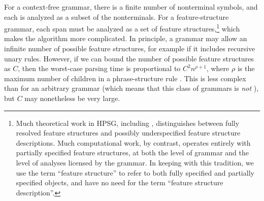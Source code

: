 \documentclass[output=paper
                ,modfonts
                ,nonflat
	        ,collection
	        ,collectionchapter
	        ,collectiontoclongg
 	        ,biblatex
                ,babelshorthands
                ,newtxmath
                ,draftmode
                ,colorlinks, citecolor=brown
]{./langsci/langscibook}
\begin{document}
For a context-free grammar,
there is a finite number of nonterminal symbols,
and each  is analyzed as a subset of the nonterminals.
For a feature-structure grammar, each span must be analyzed as a set of feature structures,\footnote{%
	Much theoretical work in HPSG, including \citet{ps2},
	distinguishes between fully resolved feature structures and possibly underspecified feature structure descriptions.
	Much computational work, by contrast, operates entirely with partially specified feature structures,
	at both the level of grammar and the level of analyses licensed by the grammar.
	In keeping with this tradition, we use the term
	``feature structure'' to refer to both fully specified and partially specified objects,
	and have no need for the term ``feature structure description''.
}
which makes the algorithm more complicated.
In principle, a grammar may allow an infinite number of possible feature structures,
for example if it includes recursive unary rules.
However, if we can bound the number of possible feature structures as $C$,
then the worst-case parsing time is proportional to $C^2 n^{\rho+1}$,
where $\rho$ is the maximum number of children in a phrase-structure rule
\citep[Section~3.2.3]{carroll1993parse}. 
This is less complex than for an arbitrary grammar
(which means that this class of grammars is \emph{not} ),
but $C$ may nonetheless be very large.

\end{document}
